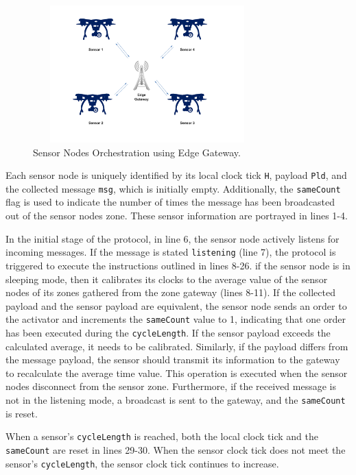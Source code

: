 \noindent
\begin{figure}[!htbp]
    \centering
    		\includegraphics[width=250pt, height =150pt]{exampleEdge.pdf}
    \caption{Sensor Nodes Orchestration using Edge Gateway. }
    \label{fig:edge}
\end{figure} 


Each sensor node is uniquely identified by its local clock tick \texttt{H}, payload \texttt{Pld}, and the collected message \texttt{msg}, which is initially empty. Additionally, the \texttt{sameCount} flag is used to indicate the number of times the message has been broadcasted out of the sensor nodes zone. These sensor information are portrayed in lines 1-4. 

In the initial stage of the protocol, in line 6, the sensor node actively listens for incoming messages. If the message is stated \texttt{listening} (line 7), the protocol is triggered to execute the instructions outlined in lines 8-26. if the sensor node is in sleeping mode, then it calibrates its clocks to the average value of the sensor nodes of its zones gathered from the zone gateway (lines 8-11). If the collected payload and the sensor payload are equivalent, the sensor node sends an order to the activator and increments the \texttt{sameCount} value to 1, indicating that one order has been executed during the \texttt{cycleLength}. If the sensor payload exceeds the calculated average, it needs to be calibrated.
Similarly, if the payload differs from the message payload, the sensor should transmit its information to the gateway to recalculate the average time value. This operation is executed when the sensor nodes disconnect from the sensor zone. Furthermore, if the received message is not in the listening mode, a broadcast is sent to the gateway, and the \texttt{sameCount} is reset.


When a sensor's \texttt{cycleLength} is reached, both the local clock tick and the \texttt{sameCount} are reset in lines 29-30. When the sensor clock tick does not meet the sensor's \texttt{cycleLength}, the sensor clock tick continues to increase.

